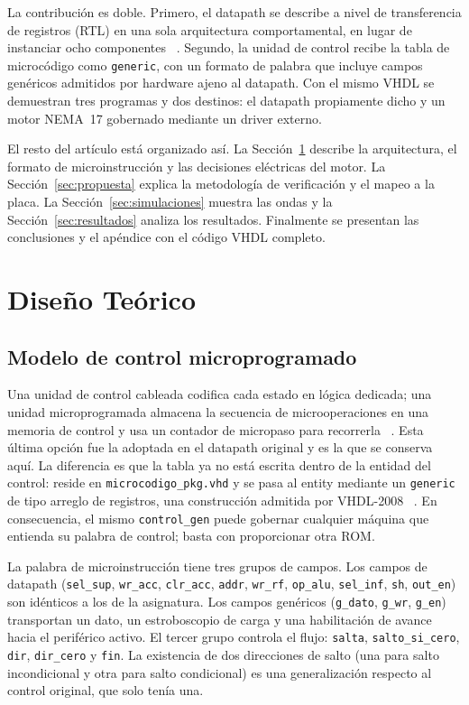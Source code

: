 \documentclass[llncs]{llncs}
\begin{document}
La contribución es doble. Primero, el datapath se describe a nivel de
transferencia de registros (RTL) en una sola arquitectura comportamental, en
lugar de instanciar ocho componentes ~\cite{ashenden2008,brown2009}. Segundo,
la unidad de control recibe la tabla de microcódigo como \texttt{generic}, con
un formato de palabra que incluye campos genéricos admitidos por hardware
ajeno al datapath. Con el mismo VHDL se demuestran tres programas y dos
destinos: el datapath propiamente dicho y un motor NEMA~17 gobernado mediante
un driver externo.

El resto del artículo está organizado así. La Sección~\ref{sec:diseno} describe
la arquitectura, el formato de microinstrucción y las decisiones eléctricas del
motor. La Sección~\ref{sec:propuesta} explica la metodología de verificación y
el mapeo a la placa. La Sección~\ref{sec:simulaciones} muestra las ondas y la
Sección~\ref{sec:resultados} analiza los resultados. Finalmente se presentan
las conclusiones y el apéndice con el código VHDL completo.

\section{Diseño Teórico}
\label{sec:diseno}

\subsection{Modelo de control microprogramado}

Una unidad de control cableada codifica cada estado en lógica dedicada; una
unidad microprogramada almacena la secuencia de microoperaciones en una memoria
de control y usa un contador de micropaso para recorrerla
~\cite{stallings2016,tanenbaum2013}. Esta última opción fue la adoptada en el
datapath original y es la que se conserva aquí. La diferencia es que la tabla
ya no está escrita dentro de la entidad del control: reside en
\texttt{microcodigo\_pkg.vhd} y se pasa al entity mediante un
\texttt{generic} de tipo arreglo de registros, una construcción admitida por
VHDL-2008 ~\cite{ieee1076-2008,ieee1076-2019,ashenden2008}. En consecuencia, el mismo
\texttt{control\_gen} puede gobernar cualquier máquina que entienda su palabra
de control; basta con proporcionar otra ROM.

La palabra de microinstrucción tiene tres grupos de campos. Los campos de
datapath (\texttt{sel\_sup}, \texttt{wr\_acc}, \texttt{clr\_acc},
\texttt{addr}, \texttt{wr\_rf}, \texttt{op\_alu}, \texttt{sel\_inf},
\texttt{sh}, \texttt{out\_en}) son idénticos a los de la asignatura. Los campos
genéricos (\texttt{g\_dato}, \texttt{g\_wr}, \texttt{g\_en}) transportan un
dato, un estroboscopio de carga y una habilitación de avance hacia el
periférico activo. El tercer grupo controla el flujo: \texttt{salta},
\texttt{salto\_si\_cero}, \texttt{dir}, \texttt{dir\_cero} y \texttt{fin}.
La existencia de dos direcciones de salto (una para salto incondicional y otra
para salto condicional) es una generalización respecto al control original,
que solo tenía una.
\end{document}
